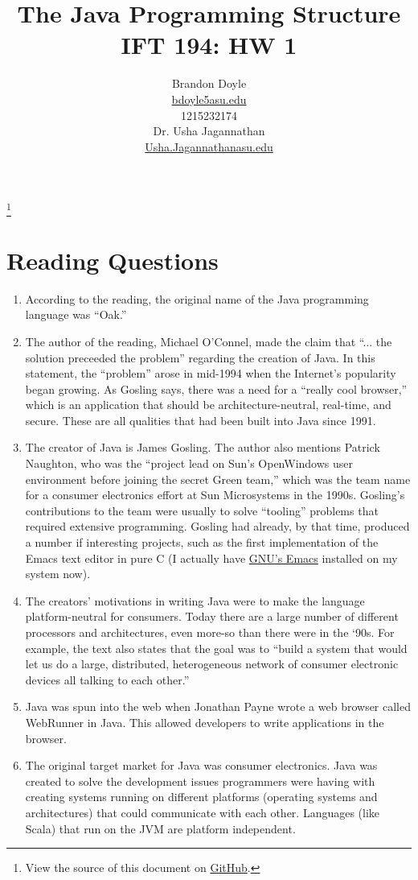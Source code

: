\documentclass[leqno, 11pt]{article}
\title{\vspace{6ex}The Java Programming Structure\\
  \Large IFT 194: HW 1}
\author{Brandon Doyle\\
\href{mailto:bdoyle@asu.edu}{bdoyle5\at{}asu.edu}\\
1215232174\\[1em]
Dr. Usha Jagannathan\\
\href{mailto:Usha.Jagannathan@asu.edu}{Usha.Jagannathan\at{}asu.edu}}
\newcommand\blfootnote[1]{%
  \begingroup
    \renewcommand\thefootnote{}\footnote{#1}
    \addtocounter{footnote}{-1}
  \endgroup
}
\begin{document}
\begin{titlepage}
\clearpage\maketitle
\thispagestyle{empty}
\end{titlepage}
\blfootnote{View the source of this document on \href{https://github.com/bjd2385/IFT_194_labs/blob/master/\jobname.tex}{GitHub}.}
\section*{Reading Questions}
\begin{enumerate}
  \item According to the reading, the original name of the Java programming language was ``Oak.''
  \item The author of the reading, Michael O'Connel, made the claim that ``... the solution preceeded the problem'' regarding the creation of Java. In this statement, the ``problem'' arose in mid-1994 when the Internet's popularity began growing. As Gosling says, there was a need for a ``really cool browser,'' which is an application that should be architecture-neutral, real-time, and secure. These are all qualities that had been built into Java since 1991.
  \item The creator of Java is James Gosling. The author also mentions Patrick Naughton, who was the ``project lead on Sun's OpenWindows user environment before joining the secret Green team,'' which was the team name for a consumer electronics effort at Sun Microsystems in the 1990s. Gosling's contributions to the team were usually to solve ``tooling'' problems that required extensive programming. Gosling had already, by that time, produced a number if interesting projects, such as the first implementation of the Emacs text editor in pure C (I actually have \href{https://www.gnu.org/software/emacs/}{GNU's Emacs} installed on my system now).
  \item The creators' motivations in writing Java were to make the language platform-neutral for consumers. Today there are a large number of different processors and architectures, even more-so than there were in the `90s. For example, the text also states that the goal was to ``build a system that would let us do a large, distributed, heterogeneous network of consumer electronic devices all talking to each other.''
  \item Java was spun into the web when Jonathan Payne wrote a web browser called WebRunner in Java. This allowed developers to write applications in the browser.
  \item The original target market for Java was consumer electronics. Java was created to solve the development issues programmers were having with creating systems running on different platforms (operating systems and architectures) that could communicate with each other. Languages (like Scala) that run on the JVM are platform independent.
\end{enumerate}
\end{document}
